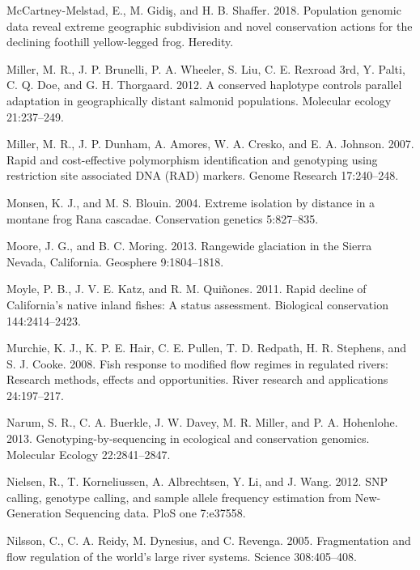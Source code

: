 \documentclass[proquest,12pt,final]{ucthesis-CA2012} %
\begin{document}
\begin{ucmainmatter}
\leavevmode\hypertarget{ref-mccartney-melstad_population_2018}{}%
McCartney-Melstad, E., M. Gidiş, and H. B. Shaffer. 2018. Population
genomic data reveal extreme geographic subdivision and novel
conservation actions for the declining foothill yellow-legged frog.
Heredity.

\leavevmode\hypertarget{ref-miller_conserved_2012}{}%
Miller, M. R., J. P. Brunelli, P. A. Wheeler, S. Liu, C. E. Rexroad 3rd,
Y. Palti, C. Q. Doe, and G. H. Thorgaard. 2012. A conserved haplotype
controls parallel adaptation in geographically distant salmonid
populations. Molecular ecology 21:237--249.

\leavevmode\hypertarget{ref-miller_rapid_2007}{}%
Miller, M. R., J. P. Dunham, A. Amores, W. A. Cresko, and E. A. Johnson.
2007. Rapid and cost-effective polymorphism identification and
genotyping using restriction site associated DNA (RAD) markers. Genome
Research 17:240--248.

\leavevmode\hypertarget{ref-monsen_extreme_2004}{}%
Monsen, K. J., and M. S. Blouin. 2004. Extreme isolation by distance in
a montane frog Rana cascadae. Conservation genetics 5:827--835.

\leavevmode\hypertarget{ref-moore_rangewide_2013}{}%
Moore, J. G., and B. C. Moring. 2013. Rangewide glaciation in the Sierra
Nevada, California. Geosphere 9:1804--1818.

\leavevmode\hypertarget{ref-moyle_rapid_2011}{}%
Moyle, P. B., J. V. E. Katz, and R. M. Quiñones. 2011. Rapid decline of
California's native inland fishes: A status assessment. Biological
conservation 144:2414--2423.

\leavevmode\hypertarget{ref-murchie_fish_2008}{}%
Murchie, K. J., K. P. E. Hair, C. E. Pullen, T. D. Redpath, H. R.
Stephens, and S. J. Cooke. 2008. Fish response to modified flow regimes
in regulated rivers: Research methods, effects and opportunities. River
research and applications 24:197--217.

\leavevmode\hypertarget{ref-narum_genotyping-by-sequencing_2013}{}%
Narum, S. R., C. A. Buerkle, J. W. Davey, M. R. Miller, and P. A.
Hohenlohe. 2013. Genotyping-by-sequencing in ecological and conservation
genomics. Molecular Ecology 22:2841--2847.

\leavevmode\hypertarget{ref-nielsen_snp_2012}{}%
Nielsen, R., T. Korneliussen, A. Albrechtsen, Y. Li, and J. Wang. 2012.
SNP calling, genotype calling, and sample allele frequency estimation
from New-Generation Sequencing data. PloS one 7:e37558.

\leavevmode\hypertarget{ref-nilsson_fragmentation_2005}{}%
Nilsson, C., C. A. Reidy, M. Dynesius, and C. Revenga. 2005.
Fragmentation and flow regulation of the world's large river systems.
Science 308:405--408.


\end{ucmainmatter}
\end{document}
